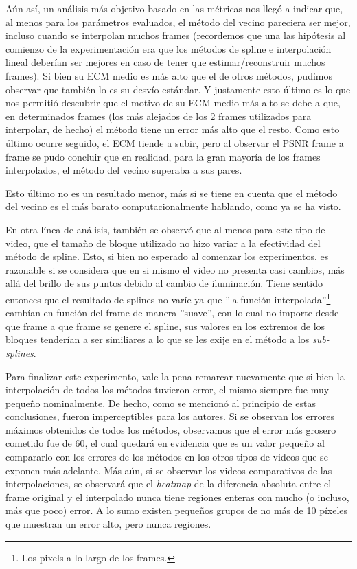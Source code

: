 \par A\'un as\'i, un an\'alisis m\'as objetivo basado en las m\'etricas nos
lleg\'o a indicar que, al menos para los par\'ametros evaluados, el m\'etodo
del vecino pareciera ser mejor, incluso cuando se interpolan muchos frames
(recordemos que una las hip\'otesis al comienzo de la experimentaci\'on era que
los m\'etodos de spline e interpolaci\'on lineal deber\'ian ser mejores en caso
de tener que estimar/reconstruir muchos frames). Si bien su ECM medio es m\'as
alto que el de otros m\'etodos, pudimos observar que tambi\'en lo es su
desv\'io est\'andar. Y justamente esto \'ultimo es lo que nos permiti\'o
descubrir que el motivo de su ECM medio m\'as alto se debe a que, en
determinados frames (los m\'as alejados de los 2 frames utilizados para
interpolar, de hecho) el m\'etodo tiene un error m\'as alto que el resto. Como
esto \'ultimo ocurre seguido, el ECM tiende a subir, pero al observar el PSNR
frame a frame se pudo concluir que en realidad, para la gran mayor\'ia de los
frames interpolados, el m\'etodo del vecino superaba a sus pares.

\par Esto \'ultimo no es un resultado menor, m\'as si se tiene en cuenta que
el m\'etodo del vecino es el m\'as barato computacionalmente hablando, como ya
se ha visto.

\par En otra l\'inea de an\'alisis, tambi\'en se observ\'o que al menos para
este tipo de video, que el tama\~no de bloque utilizado no hizo variar a la
efectividad del m\'etodo de spline. Esto, si bien no esperado al comenzar los
experimentos, es razonable si se considera que en si mismo el video no presenta
casi cambios, m\'as all\'a del brillo de sus puntos debido al cambio de
iluminaci\'on. Tiene sentido entonces que el resultado de splines no var\'ie ya
que ''la funci\'on interpolada''\footnote{Los pixels a lo largo de los frames.}
camb\'ian en funci\'on del frame de manera ''suave'', con lo cual no importe
desde que frame a que frame se genere el spline, sus valores en los extremos de
los bloques tender\'ian a ser similiares a lo que se les exije en el m\'etodo a
los \emph{sub-splines}.

\par Para finalizar este experimento, vale la pena remarcar nuevamente que si
bien la interpolaci\'on de todos los m\'etodos tuvieron error, el mismo siempre
fue muy peque\~no nominalmente. De hecho, como se mencion\'o al principio de
estas conclusiones, fueron imperceptibles para los autores. Si se observan los
errores m\'aximos obtenidos de todos los m\'etodos, observamos que el error
m\'as grosero cometido fue de 60, el cual quedar\'a en evidencia que es un
valor peque\~no al compararlo con los errores de los m\'etodos en los otros
tipos de videos que se exponen m\'as adelante. M\'as a\'un, si se observar los
videos comparativos de las interpolaciones, se observar\'a que el \emph{heatmap}
de la diferencia absoluta entre el frame original y el interpolado nunca tiene
regiones enteras con mucho (o incluso, m\'as que poco) error. A lo sumo existen
peque\~nos grupos de no m\'as de 10 p\'ixeles que muestran un error alto, pero
nunca regiones.


